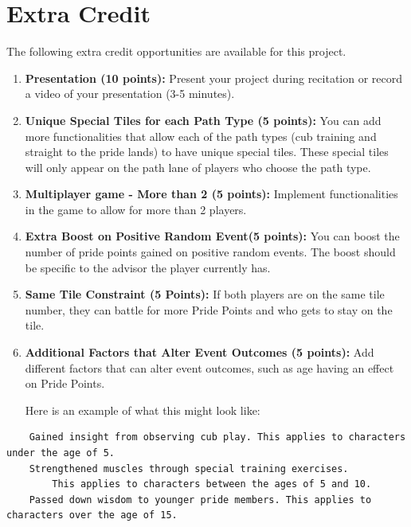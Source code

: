 \section{\textbf{Extra Credit}}

The following extra credit opportunities are available for this project.

\begin{enumerate}
    \item \textbf{Presentation (10 points):} Present your project during recitation or record a video of your presentation (3-5 minutes).
    \item \textbf{Unique Special Tiles for each Path Type (5 points):}  You can add more functionalities that allow each of the path types (cub training and straight to the pride lands) to have unique special tiles. These special tiles will only appear on the path lane of players who choose the path type.
    \item \textbf{Multiplayer game - More than 2 (5 points):} Implement functionalities in the game to allow for more than 2 players.
    \item \textbf{Extra Boost on Positive Random Event(5 points):} You can boost the number of pride points gained on positive random events. The boost should be specific to the advisor the player currently has.
    \item   \textbf{Same Tile Constraint (5 Points):} If both players are on the same tile number, they can battle for more Pride Points and who gets to stay on the tile. 
    \item \textbf{Additional Factors that Alter Event Outcomes (5 points):} Add different factors that can alter event outcomes, such as age having an effect on Pride Points. 

Here is an example of what this might look like:

\end{enumerate}
\begin{verbatim}
    Gained insight from observing cub play. This applies to characters under the age of 5.
    Strengthened muscles through special training exercises. 
        This applies to characters between the ages of 5 and 10.
    Passed down wisdom to younger pride members. This applies to characters over the age of 15.
\end{verbatim}

